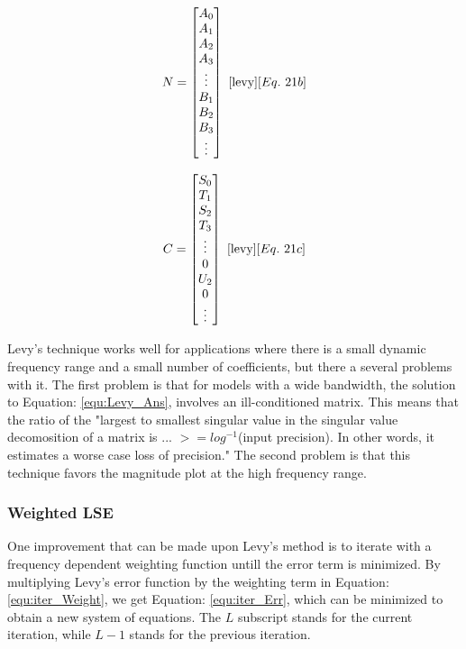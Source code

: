 \begin{multicols}{2}
    \begin{equation}
        \label{equ:Levy_N}
        N = 
        \begin{bmatrix}
            A_0 \\
            A_1 \\
            A_2 \\
            A_3 \\
            \vdots \\
            B_1 \\
            B_2 \\
            B_3 \\
            \vdots
        \end{bmatrix}
        ~\cite{levy}[Eq.~21b]
    \end{equation}

    \begin{equation}
        \label{equ:Levy_C}
        C = 
        \begin{bmatrix}
            S_0 \\
            T_1 \\
            S_2 \\
            T_3 \\
            \vdots \\
            0   \\
            U_2 \\
            0   \\
            \vdots
        \end{bmatrix}
        ~\cite{levy}[Eq.~21c]
    \end{equation}
\end{multicols}

Levy's technique works well for applications where there is a small dynamic frequency range and a small number of coefficients, but there a several problems with it.
The first problem is that for models with a wide bandwidth, the solution to Equation: \eqref{equ:Levy_Ans}, involves an ill-conditioned matrix. This means that the ratio of the "largest to smallest singular value in the singular value decomosition of a matrix is ... $>= log^{-1}$(input precision). In other words, it estimates a worse case loss of precision."
The second problem is that this technique favors the magnitude plot at the high frequency range. 



\subsubsection{Weighted LSE}
\label{sec:weightedLSE}
One improvement that can be made upon Levy's method is to iterate with a frequency dependent weighting function untill the error term is minimized\cite{levy_iter}. By multiplying Levy's error function by the weighting term in Equation: \eqref{equ:iter_Weight}, we get Equation: \eqref{equ:iter_Err}, which can be minimized to obtain a new system of equations.
The $L$ subscript stands for the current iteration, while $L-1$ stands for the previous iteration.


